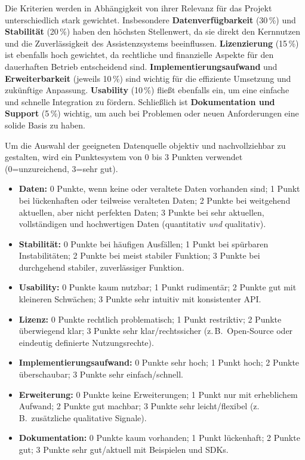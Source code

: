     Die Kriterien werden in Abhängigkeit von ihrer Relevanz für das Projekt unterschiedlich stark gewichtet.
    Insbesondere \textbf{Datenverfügbarkeit} (30\,\%) und \textbf{Stabilität} (20\,\%) haben den höchsten Stellenwert, da sie direkt den Kernnutzen und die Zuverlässigkeit des Assistenzsystems beeinflussen.
    \textbf{Lizenzierung} (15\,\%) ist ebenfalls hoch gewichtet, da rechtliche und finanzielle Aspekte für den dauerhaften Betrieb entscheidend sind.
    \textbf{Implementierungsaufwand} und \textbf{Erweiterbarkeit} (jeweils 10\,\%) sind wichtig für die effiziente Umsetzung und zukünftige Anpassung.
    \textbf{Usability} (10\,\%) fließt ebenfalls ein, um eine einfache und schnelle Integration zu fördern.
    Schließlich ist \textbf{Dokumentation und Support} (5\,\%) wichtig, um auch bei Problemen oder neuen Anforderungen eine solide Basis zu haben.

    \global\def\VGewichtDatenquellen{30}
    \global\def\VGewichtStabilität{20}
    \global\def\VGewichtUsability{10}
    \global\def\VGewichtLizenz{15}
    \global\def\VGewichtImplementierung{10}
    \global\def\VGewichtErweiterung{10}
    \global\def\VGewichtDokumentation{5}


    Um die Auswahl der geeigneten Datenquelle objektiv und nachvollziehbar zu gestalten, wird ein Punktesystem von 0 bis 3 Punkten verwendet (0{=}unzureichend, 3{=}sehr gut).

    \begin{itemize}
      \item \textbf{Daten:} 0 Punkte, wenn keine oder veraltete Daten vorhanden sind;
      1 Punkt bei lückenhaften oder teilweise veralteten Daten;
      2 Punkte bei weitgehend aktuellen, aber nicht perfekten Daten;
      3 Punkte bei sehr aktuellen, vollständigen und hochwertigen Daten (quantitativ \emph{und} qualitativ).
      \item \textbf{Stabilität:} 0 Punkte bei häufigen Ausfällen;
      1 Punkt bei spürbaren Instabilitäten;
      2 Punkte bei meist stabiler Funktion;
      3 Punkte bei durchgehend stabiler, zuverlässiger Funktion.
      \item \textbf{Usability:} 0 Punkte kaum nutzbar;
      1 Punkt rudimentär;
      2 Punkte gut mit kleineren Schwächen;
      3 Punkte sehr intuitiv mit konsistenter \acs{API}.
      \item \textbf{Lizenz:} 0 Punkte rechtlich problematisch;
      1 Punkt restriktiv;
      2 Punkte überwiegend klar;
      3 Punkte sehr klar/rechtssicher (z.\,B.\ Open-Source oder eindeutig definierte Nutzungsrechte).
      \item \textbf{Implementierungsaufwand:} 0 Punkte sehr hoch;
      1 Punkt hoch;
      2 Punkte überschaubar;
      3 Punkte sehr einfach/schnell.
      \item \textbf{Erweiterung:} 0 Punkte keine Erweiterungen;
      1 Punkt nur mit erheblichem Aufwand;
      2 Punkte gut machbar;
      3 Punkte sehr leicht/flexibel (z.\,B.\ zusätzliche qualitative Signale).
      \item \textbf{Dokumentation:} 0 Punkte kaum vorhanden;
      1 Punkt lückenhaft;
      2 Punkte gut;
      3 Punkte sehr gut/aktuell mit Beispielen und SDKs.
    \end{itemize}


